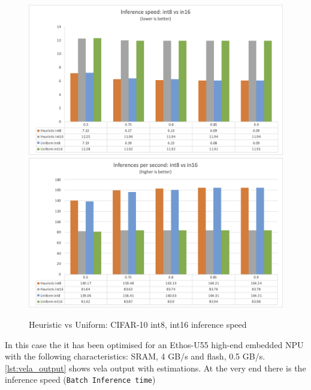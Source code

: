 \begin{figure}
    \centering
    {\includegraphics[width=1\linewidth]{images/results/cifar10_inf_speed.png}}
    {\includegraphics[width=1\linewidth]{images/results/cifar10_infs_second.png}}
    \caption{Heuristic vs Uniform: CIFAR-10 int8, int16 inference speed}\label{fig:cifar10_inf_speed}
\end{figure}

In this case the it has been optimised for an Ethos-U55 high-end embedded NPU
with the following characteristics: SRAM, 4 GB/s and flash, 0.5 GB/s.
\autoref{lst:vela_output} shows vela output with estimations. At the very end
there is the inference speed (\texttt{Batch Inference time})

